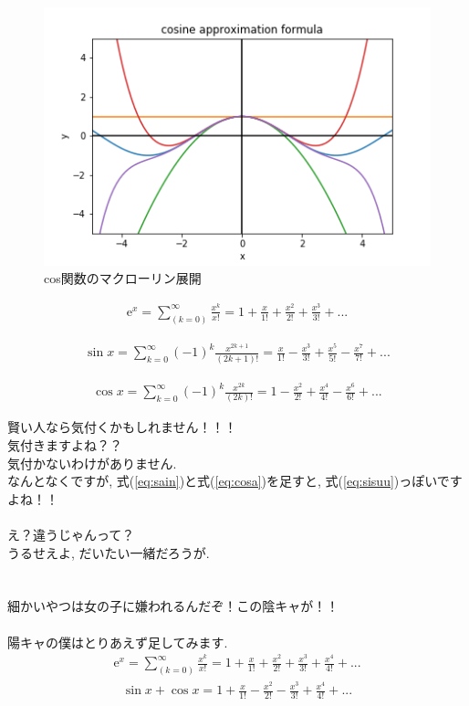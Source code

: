 \documentclass[11pt,a4paper]{jreport}
\begin{document}
\begin{figure}[H]
\label{im:cosine}
  \centering
  \includegraphics[width=120mm,bb=0 0 432 288]{figures/cosine.png}
  \caption{cos関数のマクローリン展開}
\end{figure}

\begin{eqnarray}
\mathrm{e}^x = \sum_{(k=0)}^\infty \frac{x^k}{x!} = 1 + \frac{x}{1!} + \frac{x^2}{2!} + \frac{x^3}{3!} + ...
\label{eq:sisuu}
\end{eqnarray}

\begin{eqnarray}
\sin x = \sum_{k=0}^{\infty}(-1)^k \frac{x^{2k + 1}}{(2k + 1)!} = \frac{x}{1!} - \frac{x^3}{3!} + \frac{x^5}{5!} - \frac{x^7}{7!} +  ...
\label{eq:sain}
\end{eqnarray}

\begin{eqnarray}
\cos x = \sum_{k=0}^\infty(-1)^k \frac{x^{2k}}{(2k)!} = 1 - \frac{x^2}{2!} + \frac{x^4}{4!} - \frac{x^6}{6!} + ...
\label{eq:cosa}
\end{eqnarray}

賢い人なら気付くかもしれません！！！\\
気付きますよね？？\\
気付かないわけがありません.\\
なんとなくですが, 式(\ref{eq:sain})と式(\ref{eq:cosa})を足すと, 式(\ref{eq:sisuu})っぽいですよね！！\\
\\
え？違うじゃんって？\\
うるせえよ, だいたい一緒だろうが.\\
\\
\\
細かいやつは女の子に嫌われるんだぞ！この陰キャが！！\\
\\
陽キャの僕はとりあえず足してみます.
\\
\begin{eqnarray}
\mathrm{e}^x = \sum_{(k=0)}^\infty \frac{x^k}{x!} = 1 + \frac{x}{1!} + \frac{x^2}{2!} + \frac{x^3}{3!} + \frac{x^4}{4!} + ...
\end{eqnarray}
\begin{eqnarray}
\sin x + \cos x = 1 + \frac{x}{1!} - \frac{x^2}{2!} - \frac{x^3}{3!} + \frac{x^4}{4!} + ...
\label{eq:mix}
\end{eqnarray}
\end{document}
